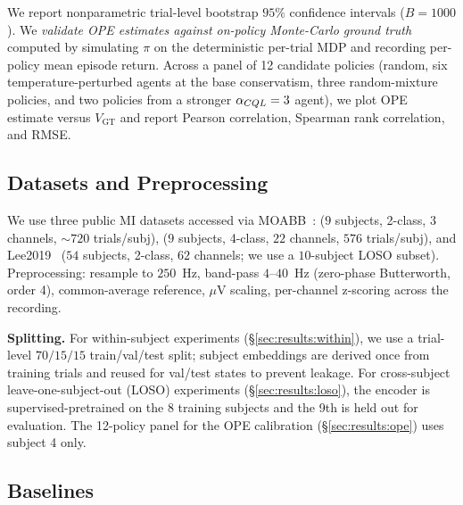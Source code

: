 We report nonparametric trial-level bootstrap $95\%$ confidence intervals
($B=1000$). We \emph{validate OPE estimates against
on-policy Monte-Carlo ground truth} computed by simulating $\pi$ on the
deterministic per-trial MDP and recording per-policy mean episode
return. Across a panel of 12 candidate policies (random, six
temperature-perturbed \cql{} agents at the base conservatism, three
random-mixture policies, and two policies from a stronger
$\alpha_{CQL} = 3$ agent), we plot OPE estimate versus $V_{\text{GT}}$
and report Pearson correlation, Spearman rank correlation, and RMSE.

\subsection{Datasets and Preprocessing}\label{sec:methods:data}

We use three public MI datasets accessed via MOABB~\cite{MOABB2018}:
\bcib{} ($9$ subjects, 2-class, $3$ channels, $\sim\!720$ trials/subj),
\bcia{} ($9$ subjects, 4-class, $22$ channels, $576$ trials/subj), and
Lee2019~\cite{Lee2019MI} ($54$ subjects, 2-class, $62$ channels;
we use a $10$-subject LOSO subset).
Preprocessing: resample to $250$~Hz, band-pass $4$--$40$~Hz
(zero-phase Butterworth, order 4), common-average reference,
$\mu$V scaling, per-channel z-scoring across the recording.

\textbf{Splitting.} For within-subject experiments
(\S\ref{sec:results:within}), we use a trial-level $70/15/15$
train/val/test split; subject embeddings are derived once from
training trials and reused for val/test states to prevent leakage.
For cross-subject leave-one-subject-out (LOSO) experiments
(\S\ref{sec:results:loso}), the encoder is supervised-pretrained on the
8 training subjects and the 9th is held out for evaluation. The 12-policy
panel for the OPE calibration (\S\ref{sec:results:ope}) uses
\bcib{} subject 4 only.

\subsection{Baselines}\label{sec:methods:baselines}

